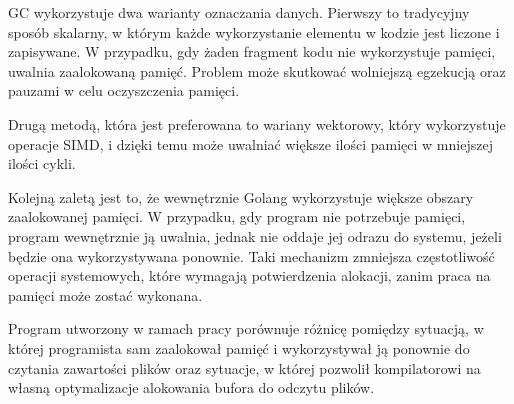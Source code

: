 GC wykorzystuje dwa warianty oznaczania danych. Pierwszy to tradycyjny sposób
skalarny, w którym każde wykorzystanie elementu w kodzie jest liczone i
zapisywane. W przypadku, gdy żaden fragment kodu nie wykorzystuje pamięci,
uwalnia zaalokowaną pamięć. Problem może skutkować wolniejszą egzekucją oraz
pauzami w celu oczyszczenia pamięci.

Drugą metodą, która jest preferowana to wariany wektorowy, który wykorzystuje 
operacje SIMD, i dzięki temu może uwalniać większe ilości pamięci w  mniejszej
ilości cykli. 

Kolejną zaletą jest to, że wewnętrznie Golang wykorzystuje większe obszary
zaalokowanej pamięci. W przypadku, gdy program nie potrzebuje pamięci, program
wewnętrznie ją uwalnia, jednak nie oddaje jej odrazu do systemu, jeżeli będzie 
ona wykorzystywana ponownie. Taki mechanizm zmniejsza częstotliwość operacji
systemowych, które wymagają potwierdzenia alokacji, zanim praca na pamięci może
zostać wykonana. 

Program utworzony w ramach pracy porównuje różnicę pomiędzy sytuacją, w której
programista sam zaalokował pamięć i wykorzystywał ją ponownie do czytania 
zawartości plików oraz sytuacje, w której pozwolił kompilatorowi na własną
optymalizacje alokowania bufora do odczytu plików.




